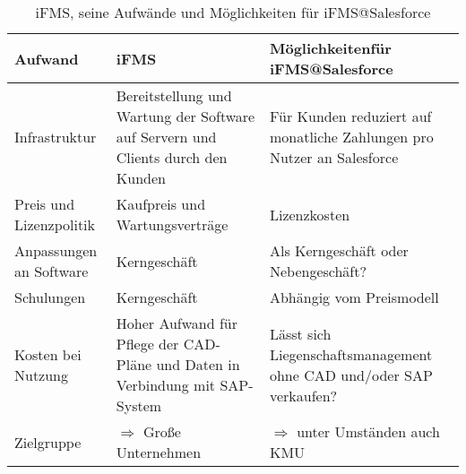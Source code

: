  \begin{table}[bh]
\centering
\begin{tabular}[width=0.9\textwidth]
{|p{}|p{}|p{}|}
\hline
\textbf{Aufwand} & \centering\textbf{iFMS} & 
{\centering\textbf{Möglichkeiten\newline für iFMS@\-Salesforce}} \\
\hline
Infrastruktur & Bereitstellung und Wartung der Soft\-ware auf 
Servern und Clients durch den Kunden & Für Kunden reduziert auf monatliche 
Zahlungen pro Nutzer an Salesforce\\
\hline
Preis und Lizenzpolitik & Kaufpreis und Wartungsverträge & Lizenzkosten \\
\hline
Anpassungen an Software & Kerngeschäft & Als Kerngeschäft oder Nebengeschäft? \\
\hline
Schulungen & Kerngeschäft & Abhängig vom Preismodell \\
\hline
Kosten bei Nutz\-ung & Hoher Aufwand für Pflege der CAD-Pläne und Daten in 
Verbindung mit SAP-System & Lässt sich Liegenschaftsmanagement ohne CAD 
und/oder SAP verkaufen? \\
\hline
Zielgruppe & $\Rightarrow$ Große Unternehmen & $\Rightarrow$ unter Umständen 
auch KMU \\
\hline
\end{tabular}
\caption{iFMS, seine Aufwände und Möglichkeiten für iFMS@Salesforce}
\label{tab:kosten_fuer_ifms}
\end{table}

\begin{comment}
\subsubsection{Sonstiges}
\begin{itemize}
\item \textbf{Google Scholar:} Suchdienst für wissenschaftliche Recherchen 
(http://scholar.google.de)
\item \textbf{Verlagswebseiten} Recherche und den Zugriff auf Zeitschriften- 
und 
Zeitungsartikel und E-Books
\item \textbf{Webseiten von Unternehmen} für die Recherche von 
Unternehmensdaten 
und-statistiken sowie Unternehmensdatenbanken
\item \textbf{Webseiten von Bundes- und Landesbehörden sowie der EU}
 Statistisches Bundesamt (http://www.destatis.de)
\\Presse- und Informationsamt der Bundesregierung 
(http://www.bundesregierung.de)
\item \textbf{Webseiten von Marktforschungsinstituten}
(für Marktanteile und Verbraucheranalysen)
\item \textbf{Webseiten von Verbänden und Kammern}
Institut der deutschen Wirtschaft (http://www.deutsche-wirtschaft.de)
\end{itemize}
\end{comment}
